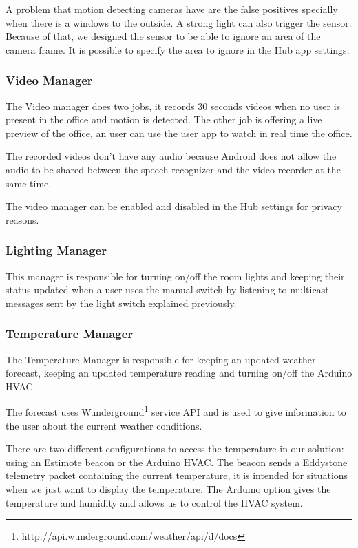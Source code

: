 A problem that motion detecting cameras have are the false positives specially when there is a windows to the outside. A strong light can also trigger the sensor. Because of that, we designed the sensor to be able to ignore an area of the camera frame. It is possible to specify the area to ignore in the Hub app settings.


\subsubsection{Video Manager}

The Video manager does two jobs, it records 30 seconds videos when no user is present in the office and motion is detected. The other job is offering a live preview of the office, an user can use the user app to watch in real time the office.

The recorded videos don't have any audio because Android does not allow the audio to be shared between the speech recognizer and the video recorder at the same time.

The video manager can be enabled and disabled in the Hub settings for privacy reasons.



\subsubsection{Lighting Manager}

This manager is responsible for turning on/off the room lights and keeping their status updated when a user uses the manual switch by listening to multicast messages sent by the light switch explained previously. 






\subsubsection{Temperature Manager}\label{temperature_manager_imp}


The Temperature Manager is responsible for keeping an updated weather forecast, keeping an updated temperature reading and turning on/off the Arduino \ac{HVAC}.

The forecast uses Wunderground\footnote{http://api.wunderground.com/weather/api/d/docs} service API and is used to give information to the user about the current weather conditions.

There are two different configurations to access the temperature in our solution: using an Estimote beacon or the Arduino \ac{HVAC}. 
The beacon sends a Eddystone telemetry packet containing the current temperature, it is intended for situations when we just want to display the temperature.
The Arduino option gives the temperature and humidity and allows us to control the \ac{HVAC} system.


